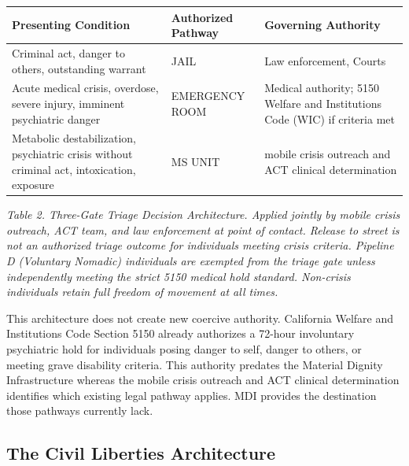\documentclass[12pt, letterpaper]{article}
\begin{document}
{\singlespacing
\begin{tabularx}{\textwidth}{@{}p{5.5cm}p{3cm}X@{}}
\toprule
\rowcolor{rowgray}
Presenting Condition & Authorized Pathway & Governing Authority \\
\midrule
Criminal act, danger to others, outstanding warrant & JAIL & Law enforcement, Courts \\
\rowcolor{rowgray}
Acute medical crisis, overdose, severe injury, imminent psychiatric danger & EMERGENCY ROOM & Medical authority; 5150 Welfare and Institutions Code (WIC) if criteria met \\
Metabolic destabilization, psychiatric crisis without criminal act, intoxication, exposure & MS UNIT & mobile crisis outreach and ACT clinical determination \\
\bottomrule
\end{tabularx}\par
\vspace{8pt}
\noindent\textit{Table 2. Three-Gate Triage Decision Architecture. Applied jointly by mobile crisis outreach, ACT team, and law enforcement at point of contact. Release to street is not an authorized triage outcome for individuals meeting crisis criteria. Pipeline D (Voluntary Nomadic) individuals are exempted from the triage gate unless independently meeting the strict 5150 medical hold standard. Non-crisis individuals retain full freedom of movement at all times.}
\par}

This architecture does not create new coercive authority. California Welfare and Institutions Code Section 5150 already authorizes a 72-hour involuntary psychiatric hold for individuals posing danger to self, danger to others, or meeting grave disability criteria. This authority predates the Material Dignity Infrastructure whereas the mobile crisis outreach and ACT clinical determination identifies which existing legal pathway applies. MDI provides the destination those pathways currently lack.

\subsection{The Civil Liberties Architecture}
\end{document}

